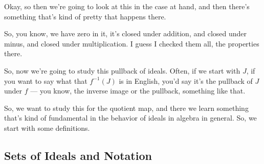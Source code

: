 \begin{speech}[00:14:42 - 00:16:01]
Okay, so then we're going to look at this in the case at hand, and then there's something that's kind of pretty that happens there. 

So, you know, we have zero in it, it's closed under addition, and closed under minus, and closed under multiplication. I guess I checked them all, the properties there.

So, now we're going to study this pullback of ideals. Often, if we start with $J$, if you want to say what that $f^{-1}(J)$ is in English, you'd say it's the pullback of $J$ under $f$ --- you know, the inverse image or the pullback, something like that.

So, we want to study this for the quotient map, and there we learn something that's kind of fundamental in the behavior of ideals in algebra in general. So, we start with some definitions.
\end{speech}

\subsection{Sets of Ideals and Notation}

